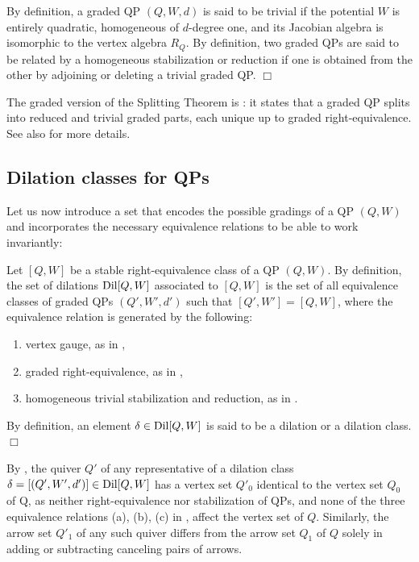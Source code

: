 \begin{definition}\label{def:hom-trivial}
By definition, a graded QP $(Q,W,d)$ is said to be trivial if the potential $W$ is entirely quadratic, homogeneous of $d$-degree one, and its Jacobian algebra is isomorphic to the vertex algebra $R_Q$. By definition, two graded QPs are said to be related by a homogeneous stabilization or reduction if one is obtained from the other by adjoining or deleting a trivial graded QP.
\hfill$\Box$\end{definition}

The graded version of the Splitting Theorem \cite[Theorem~4.6]{DWZ} is \cite[Theorem~6.6]{AO}: it states that a graded QP splits into reduced and
trivial graded parts, each unique up to graded right-equivalence. See also \cite{Keller2026_GradedPreprint} for more details.

\subsection{Dilation classes for QPs}\label{ssec:dilation_classes}

Let us now introduce a set that encodes the possible gradings of a QP $(Q,W)$ and incorporates the necessary equivalence relations to be able to work invariantly:

\begin{definition}[Dilations]\label{def:G1}
Let $[Q,W]$ be a stable right-equivalence class of a QP $(Q,W)$. By definition, the set of dilations $\operatorname{Dil}[Q,W]$ associated to $[Q,W]$ is the set of all equivalence classes of graded QPs \((Q',W',d')\) such that $[Q',W']=[Q,W]$, where the equivalence relation is generated by the following:
\begin{enumerate}[label=(\alph*)]
\item vertex gauge, as in ,
\item graded right-equivalence, as in ,
\item homogeneous trivial stabilization and reduction, as in .
\end{enumerate}
By definition, an element \(\delta\in\operatorname{Dil}[Q,W]\) is said to be a dilation or a dilation class.
\hfill$\Box$\end{definition}

\noindent By , the quiver $Q'$ of any representative of a dilation class $\delta=[(Q',W',d')]\in\operatorname{Dil}[Q,W]$ has a vertex set $Q'_0$ identical to the vertex set $Q_0$ of Q, as neither right-equivalence nor stabilization of QPs, and none of the three equivalence relations (a), (b), (c) in , affect the vertex set of $Q$. Similarly, the arrow set $Q'_1$ of any such quiver differs from the arrow set $Q_1$ of $Q$ solely in adding or subtracting canceling pairs of arrows.


